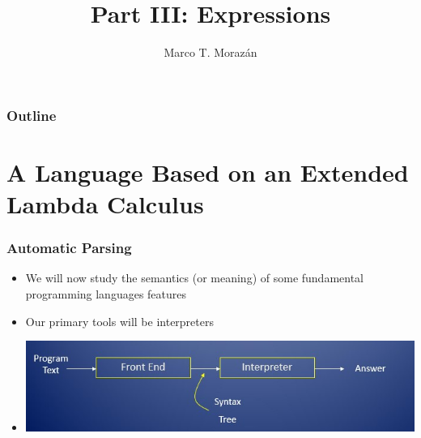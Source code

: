 \documentclass{beamer}
\begin{document}
\title{Part III: Expressions}
\author{Marco T. Moraz\'{a}n}
\date{}

\begin{frame}
\titlepage
\end{frame}

\begin{frame}
\frametitle{Outline}
\tableofcontents
\end{frame}

\section{A Language Based on an Extended Lambda Calculus}

\begin{frame}[fragile]
\frametitle{Automatic Parsing}
\begin{scriptsize}
\begin{itemize}
\item<1-> We will now study the semantics (or meaning) of some fundamental programming languages features

\item<1-> Our primary tools will be interpreters

\item<2->
\begin{center}
\includegraphics[scale=0.8]{interpreter-arch.jpg}
\end{center}

\end{itemize}
\end{scriptsize}
\end{frame}
\end{document}
